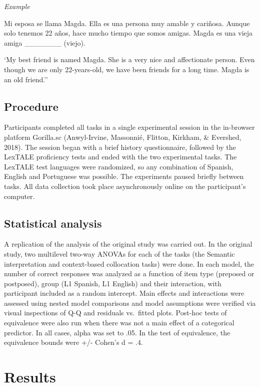 \documentclass[
  man]{apa6}
\begin{document}
\emph{Example}

Mi esposa se llama Magda. Ella es una persona muy amable y cariñosa. Aunque solo tenemos 22 años, hace mucho tiempo que somos amigas. Magda es una vieja amiga \_\_\_\_\_\_\_ (viejo).

`My best friend is named Magda. She is a very nice and affectionate person. Even though we are only 22-years-old, we have been friends for a long time. Magda is an old friend.''

\hypertarget{procedure}{%
\subsection{Procedure}\label{procedure}}

Participants completed all tasks in a single experimental session in the in-browser platform Gorilla.sc (Anwyl-Irvine, Massonnié, Flitton, Kirkham, \& Evershed, 2018).
The session began with a brief history questionnaire, followed by the LexTALE proficiency tests and ended with the two experimental tasks.
The LexTALE test languages were randomized, so any combination of Spanish, English and Portuguese was possible.
The experiments paused briefly between tasks.
All data collection took place asynchronously online on the participant's computer.

\hypertarget{statistical-analysis}{%
\subsection{Statistical analysis}\label{statistical-analysis}}

A replication of the analysis of the original study was carried out.
In the original study, two multilevel two-way ANOVAs for each of the tasks (the Semantic interpretation and context-based collocation tasks) were done.
In each model, the number of correct responses was analyzed as a function of item type (preposed or postposed), group (L1 Spanish, L1 English) and their interaction, with participant included as a random intercept.
Main effects and interactions were assessed using nested model comparisons and model assumptions were verified via visual inspections of Q-Q and residuals vs.~fitted plots.
Post-hoc tests of equivalence were also run when there was not a main effect of a categorical predictor.
In all cases, alpha was set to .05.
In the test of equivalence, the equivalence bounds were +/- Cohen's d = .4.

\hypertarget{results}{%
\section{Results}\label{results}}
\end{document}
